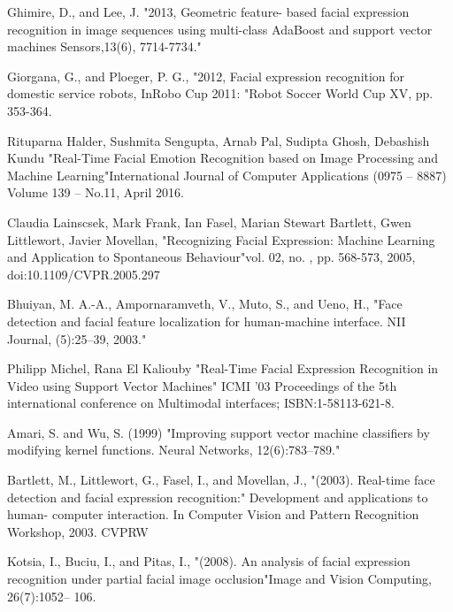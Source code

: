 \documentclass[a4paper,12pt,oneside]{article}
\begin{document}
\begin{thebibliography}{9}
Ghimire, D., and Lee, J. {"2013, Geometric feature-
based facial expression recognition in image sequences
using multi-class AdaBoost and support vector machines
Sensors,13(6), 7714-7734." }

 Giorgana, G., and Ploeger, P. G., {"2012, Facial
expression recognition for domestic service robots,
InRobo Cup 2011: "}Robot Soccer World Cup XV, pp.
353-364.

Rituparna Halder, Sushmita Sengupta, Arnab Pal,
Sudipta Ghosh, Debashish Kundu {"Real-Time Facial
Emotion Recognition based on Image Processing and
Machine Learning"}International Journal of Computer
Applications (0975 – 8887) Volume 139 – No.11, April
2016.

Claudia Lainscsek, Mark Frank, Ian Fasel, Marian
Stewart Bartlett, Gwen Littlewort, Javier Movellan, {"Recognizing Facial Expression: Machine Learning and
Application to Spontaneous Behaviour"}vol. 02, no. , pp.
568-573, 2005, doi:10.1109/CVPR.2005.297


 Bhuiyan, M. A.-A., Ampornaramveth, V., Muto, S.,
and Ueno, H., {"Face detection and facial feature
localization for human-machine interface. NII Journal,
(5):25–39, 2003."}


 Philipp Michel, Rana El Kaliouby
{"Real-Time
Facial Expression Recognition in Video using Support
Vector Machines"} ICMI '03 Proceedings of the 5th
international conference on Multimodal interfaces;
ISBN:1-58113-621-8.

 Amari, S. and Wu, S. (1999) {"Improving support
vector machine classifiers by modifying kernel
functions. Neural Networks, 12(6):783–789."}

 Bartlett, M., Littlewort, G., Fasel, I., and Movellan,
J., { "(2003). Real-time face detection and facial expression
recognition:" }Development and applications to human-
computer interaction. In Computer Vision and Pattern
Recognition Workshop, 2003. CVPRW

  Kotsia, I., Buciu, I., and Pitas, I., {"(2008). An analysis
of facial expression recognition under partial facial
image occlusion"}Image and Vision Computing,
26(7):1052– 106.

\end{thebibliography}
\end{document}
